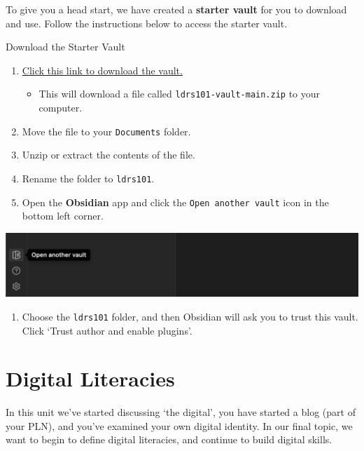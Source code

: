 \documentclass[
]{book}
\providecommand{\tightlist}{%
  \setlength{\itemsep}{0pt}\setlength{\parskip}{0pt}}
\theoremstyle{definition}
\theoremstyle{definition}
\theoremstyle{definition}
\theoremstyle{definition}
\theoremstyle{remark}
\begin{document}
To give you a head start, we have created a \textbf{starter vault} for you to download and use. Follow the instructions below to access the starter vault.

\begin{reflect}
{Download the Starter Vault}

\begin{enumerate}
\def\labelenumi{\arabic{enumi}.}
\tightlist
\item
  \href{https://github.com/twu-innovation/ldrs101-vault/archive/refs/heads/main.zip}{Click this link to download the vault.}

  \begin{itemize}
  \tightlist
  \item
    This will download a file called \texttt{ldrs101-vault-main.zip} to your computer.
  \end{itemize}
\item
  Move the file to your \texttt{Documents} folder.
\item
  Unzip or extract the contents of the file.
\item
  Rename the folder to \texttt{ldrs101}.
\item
  Open the \textbf{Obsidian} app and click the \texttt{Open\ another\ vault} icon in the bottom left corner.
\end{enumerate}

\includegraphics{assets/digital-literacy/obsidian2.png}

\begin{enumerate}
\def\labelenumi{\arabic{enumi}.}
\setcounter{enumi}{5}
\tightlist
\item
  Choose the \texttt{ldrs101} folder, and then Obsidian will ask you to trust this vault. Click `Trust author and enable plugins'.
\end{enumerate}
\end{reflect}

\hypertarget{digital-literacies-1}{%
\section{Digital Literacies}\label{digital-literacies-1}}

In this unit we've started discussing `the digital', you have started a blog (part of your PLN), and you've examined your own digital identity. In our final topic, we want to begin to define digital literacies, and continue to build digital skills.
\end{document}

